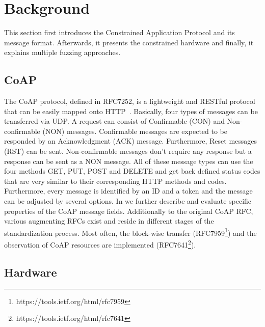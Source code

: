 \section{Background}
\label{section:background}

This section first introduces the Constrained Application Protocol and its message format. Afterwards, it presents the constrained hardware and finally, it explains multiple fuzzing approaches.

\subsection{CoAP}

The CoAP protocol, defined in RFC7252, is a lightweight and RESTful protocol that can be easily mapped onto HTTP~\cite{RFC7252}. Basically, four types of messages can be transferred via UDP. A request can consist of Confirmable (CON) and Non-confirmable (NON) messages. Confirmable messages are expected to be responded by an Acknowledgment (ACK) message. Furthermore, Reset messages (RST) can be sent. Non-confirmable messages don't require any response but a response can be sent as a NON message. All of these message types can use the four methods GET, PUT, POST and DELETE and get back defined status codes that are very similar to their corresponding HTTP methods and codes. Furthermore, every message is identified by an ID and a token and the message can be adjusted by several options. In  we further describe and evaluate specific properties of the CoAP message fields.
Additionally to the original CoAP RFC, various augmenting RFCs exist and reside in different stages of the standardization process. Most often, the block-wise transfer (RFC7959\footnote{https://tools.ietf.org/html/rfc7959}) and the observation of CoAP resources are implemented (RFC7641\footnote{https://tools.ietf.org/html/rfc7641}).

\subsection{Hardware}

